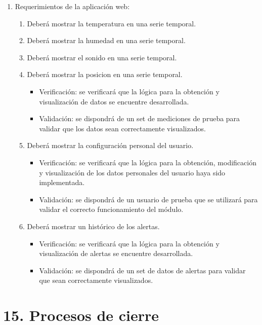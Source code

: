 \documentclass[
11pt, %
codirector, %
]{charter}
\begin{document}
\begin{enumerate}
\begin{enumerate}
		\end{enumerate}
	\item Requerimientos de la aplicación web:
		\begin{enumerate}		
			\item Deberá mostrar la temperatura en una serie temporal.	
			\item Deberá mostrar la humedad en una serie temporal.	
			\item Deberá mostrar el sonido en una serie temporal.		
			\item Deberá mostrar la posicion en una serie temporal.
				\begin{itemize}
					\item Verificación: se verificará que la lógica para la obtención y visualización de datos se encuentre desarrollada.
					\item Validación: se dispondrá de un set de mediciones de prueba para validar que los datos sean correctamente visualizados.
				\end{itemize}		
			\item Deberá mostrar la configuración personal del usuario.
				\begin{itemize}
					\item Verificación: se verificará que la lógica para la obtención, modificación y visualización de los datos personales del usuario haya sido implementada.
					\item Validación: se dispondrá de un usuario de prueba que se utilizará para validar el correcto funcionamiento del módulo.
				\end{itemize}			
			\item Deberá mostrar un histórico de los alertas.
				\begin{itemize}
					\item Verificación: se verificará que la lógica para la obtención y visualización de alertas se encuentre desarrollada.
					\item Validación: se dispondrá de un set de datos de alertas para validar que sean correctamente visualizados.
				\end{itemize}		
		\end{enumerate}
\end{enumerate}


\section{15. Procesos de cierre}    
\label{sec:cierre}
\end{document}
